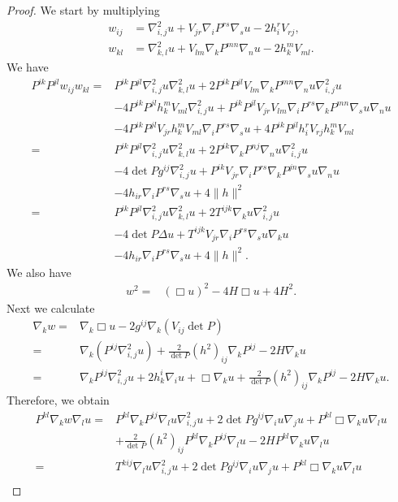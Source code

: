 \documentclass{amsart}
\theoremstyle{definition}
\theoremstyle{remark}
\numberwithin{equation}{section}
\begin{document}
\begin{proof}
We start by multiplying
\begin{align*}
w_{ij}&=\nabla^2_{i,j}u+V_{jr}\nabla_iP^{rs}\nabla_su-2h_i^rV_{rj},\\
w_{kl}&=\nabla^2_{k,l}u+V_{lm}\nabla_kP^{mn}\nabla_nu-2h_k^mV_{ml}.
\end{align*}
We have
\begin{align*}
P^{ik}P^{jl}w_{ij}w_{kl}=&P^{ik}P^{jl}\nabla^2_{i,j}u\nabla^2_{k,l}u+2P^{ik}P^{jl}V_{lm}\nabla_kP^{mn}\nabla_nu\nabla^2_{i,j}u\\
&-4P^{ik}P^{jl}h_k^mV_{ml}\nabla^2_{i,j}u+P^{ik}P^{jl}V_{jr}V_{lm}\nabla_iP^{rs}\nabla_kP^{mn}\nabla_su\nabla_nu\\
&-4P^{ik}P^{jl}V_{jr}h_k^mV_{ml}\nabla_iP^{rs}\nabla_su+4P^{ik}P^{jl}h_i^rV_{rj}h_k^mV_{ml}\\
=&P^{ik}P^{jl}\nabla^2_{i,j}u\nabla^2_{k,l}u+2P^{ik}\nabla_kP^{nj}\nabla_nu\nabla^2_{i,j}u\\
&-4\det P g^{ij}\nabla^2_{i,j}u+P^{ik}V_{jr}\nabla_iP^{rs}\nabla_kP^{jn}\nabla_su\nabla_nu\\
&-4h_{ir}\nabla_iP^{rs}\nabla_su+4\|h\|^2\\
=&P^{ik}P^{jl}\nabla^2_{i,j}u\nabla^2_{k,l}u+2T^{ijk}\nabla_ku\nabla^2_{i,j}u\\
&-4\det P \Delta u+T^{ijk}V_{jr}\nabla_iP^{rs}\nabla_su\nabla_ku\\
&-4h_{ir}\nabla_iP^{rs}\nabla_su+4\|h\|^2.
\end{align*}
We also have
\begin{align*}
w^2=&(\Box u)^2-4H\Box u+4H^2.
\end{align*}
Next we calculate
\begin{align*}
\nabla_k w=&\nabla_k\Box u-2g^{ij}\nabla_k(V_{ij}\det P)\\
=&\nabla_k(P^{ij}\nabla^2_{i,j} u)+\frac{2}{\det P}(h^2)_{ij}\nabla_kP^{ij}-2H\nabla_ku\\
=&\nabla_kP^{ij}\nabla^2_{i,j}u+2h_k^i\nabla_iu+\Box\nabla_ku+\frac{2}{\det P}(h^2)_{ij}\nabla_kP^{ij}-2H\nabla_ku.
\end{align*}
Therefore, we obtain
\begin{align*}
P^{kl}\nabla_k w\nabla_lu
=&P^{kl}\nabla_kP^{ij}\nabla_lu\nabla^2_{i,j}u+2\det Pg^{ij}\nabla_iu\nabla_ju+P^{kl}\Box\nabla_ku\nabla_lu\\
&+\frac{2}{\det P}(h^2)_{ij}P^{kl}\nabla_kP^{ij}\nabla_lu-2HP^{kl}\nabla_ku\nabla_lu\\
=&T^{kij}\nabla_lu\nabla^2_{i,j}u+2\det Pg^{ij}\nabla_iu\nabla_ju+P^{kl}\Box\nabla_ku\nabla_lu\\

\end{align*}
\end{proof}
\end{document}
